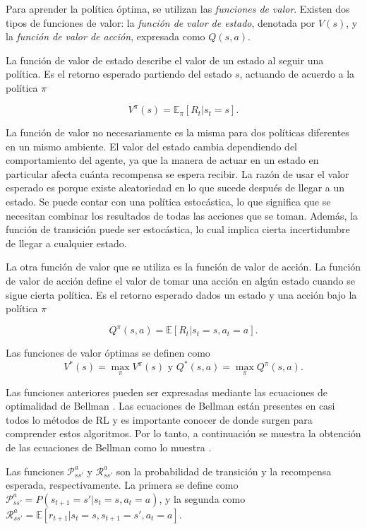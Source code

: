 Para aprender la política óptima, se utilizan las \textit{funciones de valor}. Existen dos tipos de funciones de valor: la \textit{función de valor de estado},
denotada por $V(s)$, y la \textit{función de valor de acción}, expresada como $Q(s, a)$.

La función de valor de estado describe el valor de un estado al seguir una política. Es el retorno esperado partiendo del estado $s$, actuando de acuerdo
a la política $\pi$

\begin{equation}\label{eq:state-value-func}
V^\pi(s) = \mathbb{E}_\pi[R_t | s_t = s].    
\end{equation}


La función de valor no necesariamente es la misma para dos políticas diferentes
en un mismo ambiente.  El valor del estado
cambia dependiendo del comportamiento del agente, ya que la manera de actuar
en un estado en particular afecta cuánta recompensa se espera recibir.
La razón de usar el valor esperado  es porque existe aleatoriedad en lo que
sucede después de llegar a un estado. Se puede contar con una política estocástica, lo que significa que se necesitan combinar los resultados de 
todas las acciones que se toman. Además, la función de transición puede ser estocástica, lo cual implica cierta incertidumbre de llegar a cualquier 
estado.

La otra función de valor que se utiliza es la función de valor de acción.
La función de valor de acción define el valor de 
tomar una acción en algún estado cuando se sigue cierta política. Es el
retorno esperado dados un estado y una acción bajo la política $\pi$

\begin{equation}\label{eq:action-value-func}
Q^\pi (s,a) = \mathbb{E}[R_t | s_t = s, a_t = a].    
\end{equation}

Las funciones de valor óptimas se definen como
\[
V^*(s) = \max_{\pi} V^\pi(s) \text{ y } Q^*(s, a) = \max_{\pi} Q^\pi (s,a).
\]


Las funciones anteriores pueden ser expresadas mediante las ecuaciones de optimalidad de Bellman \cite{bellman1966dynamic}.
Las ecuaciones de Bellman están presentes en casi todos lo métodos de RL y es importante conocer de donde surgen para comprender estos algoritmos. Por lo tanto, a continuación se muestra la obtención de las ecuaciones
de Bellman como lo muestra \cite{greaves}.

Las funciones $\mathcal{P}_{ss'}^a$ y $\mathcal{R}_{ss'}^a$ son la probabilidad de transición y la recompensa esperada, respectivamente. La primera se define como
$\mathcal{P}_{ss'}^a = P(s_{t+1} = s' | s_t = s, a_t = a)$,
y la segunda como
$\mathcal{R}_{ss'}^a = \mathbb{E}[r_{t+1} | s_t = s, s_{t+1} = s', a_t = a]$.

